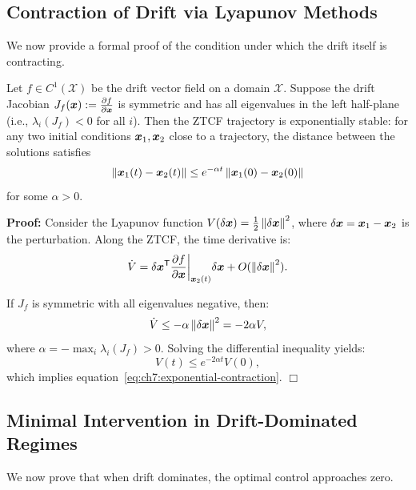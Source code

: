 \subsection{Contraction of Drift via Lyapunov Methods}

We now provide a formal proof of the condition under which the drift itself is contracting.

\begin{theorem}
\label{thm:ch7:drift-contraction-proof}
Let $f\in C^1(\mathcal{X})$ be the drift vector field on a domain $\mathcal{X}$. Suppose the
drift Jacobian $J_f(\bm{x}) := \frac{\partial f}{\partial\bm{x}}$ is symmetric and has all eigenvalues
in the left half-plane (i.e., $\lambda_i(J_f) < 0$ for all $i$). Then the ZTCF trajectory is
exponentially stable: for any two initial conditions $\bm{x}_1, \bm{x}_2$ close to a trajectory, the
distance between the solutions satisfies
\begin{equation}
\left\lVert \bm{x}_1(t) - \bm{x}_2(t) \right\rVert \leq e^{-\alpha t}\left\lVert \bm{x}_1(0) - \bm{x}_2(0) \right\rVert
\label{eq:ch7:exponential-contraction}
\end{equation}
for some $\alpha > 0$.
\end{theorem}

\noindent\textbf{Proof:} Consider the Lyapunov function $V(\delta\bm{x}) = \frac{1}{2}\left\lVert \delta\bm{x} \right\rVert^2$,
where $\delta\bm{x} = \bm{x}_1 - \bm{x}_2$ is the perturbation. Along the ZTCF, the time derivative is:
\begin{equation}
\dot{V} = \delta\bm{x}^{\mathsf{T}} \frac{\partial f}{\partial\bm{x}}\bigg|_{\bm{x}_2(t)} \delta\bm{x} + O(\left\lVert \delta\bm{x} \right\rVert^2).
\end{equation}

If $J_f$ is symmetric with all eigenvalues negative, then:
\begin{equation}
\dot{V} \leq -\alpha \left\lVert \delta\bm{x} \right\rVert^2 = -2\alpha V,
\end{equation}
where $\alpha = -\max_i \lambda_i(J_f) > 0$. Solving the differential inequality yields:
\begin{equation}
V(t) \leq e^{-2\alpha t} V(0),
\end{equation}
which implies equation~\eqref{eq:ch7:exponential-contraction}. \quad\ensuremath{\Box}

\subsection{Minimal Intervention in Drift-Dominated Regimes}

We now prove that when drift dominates, the optimal control approaches zero.

